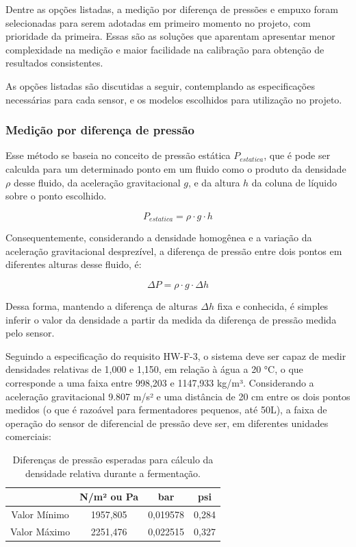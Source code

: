 Dentre as opções listadas, a medição por diferença de pressões e empuxo foram selecionadas para serem adotadas em primeiro momento no projeto, com prioridade da primeira. Essas são as soluções que aparentam apresentar menor complexidade na medição e maior facilidade na calibração para obtenção de resultados consistentes.


As opções listadas são discutidas a seguir, contemplando as especificações necessárias para cada sensor, e os modelos escolhidos para utilização no projeto.

\subsubsection{Medição por diferença de pressão} 

Esse método se baseia no conceito de pressão estática \(P_{estatica}\), que é pode ser calculda para um determinado ponto em um fluido como o produto da densidade \(\rho\) desse fluido, da aceleração gravitacional \(g\), e da altura \(h\) da coluna de líquido sobre o ponto escolhido.

\begin{equation}
P_{estatica} = \rho \cdot g \cdot h
\end{equation}

Consequentemente, considerando a densidade homogênea e a variação da aceleração gravitacional desprezível, a diferença de pressão entre dois pontos em diferentes alturas desse fluido, é:

\begin{equation}
\Delta P = \rho \cdot g \cdot \Delta h
\end{equation}

Dessa forma, mantendo a diferença de alturas \(\Delta h\) fixa e conhecida, é simples inferir o valor da densidade a partir da medida da diferença de pressão medida pelo sensor.


Seguindo a especificação do requisito HW-F-3, o sistema deve ser capaz de medir densidades relativas de 1,000 e 1,150, em relação à água a 20 °C, o que corresponde a uma faixa entre 998,203 e 1147,933 kg/m³. Considerando a aceleração gravitacional 9.807 m/s² e uma distância de 20 cm entre os dois pontos medidos (o que é razoável para fermentadores pequenos, até 50L), a faixa de operação do sensor de diferencial de pressão deve ser, em diferentes unidades comerciais:

\begin{table}
    \begin{center}
        \begin{tabular}{ |c|c|c|c| } 
            \hline
            & N/m² ou Pa & bar & psi \\
            \hline
            Valor Mínimo & 1957,805 & 0,019578 & 0,284 \\ 
            \hline
            Valor Máximo & 2251,476 & 0,022515 & 0,327 \\ 
            \hline
        \end{tabular}
        \caption{\label{tab:densidades}Diferenças de pressão esperadas para cálculo da densidade relativa durante a fermentação.}
    \end{center}
\end{table}

